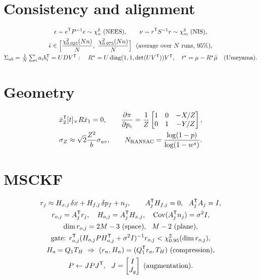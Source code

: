 \section*{Consistency and alignment}
\begin{gather*}
  \epsilon = e^{\mathsf{T}} P^{-1} e \sim \chi^2_n \ \text{(NEES)}, \qquad \nu = r^{\mathsf{T}} S^{-1} r \sim \chi^2_m \ \text{(NIS)}, \\
  \bar\epsilon \in \Big[\frac{\chi^2_{0.025}(Nn)}{N},\ \frac{\chi^2_{0.975}(Nn)}{N}\Big] \ \ \text{(average over } N\text{ runs, 95\%)}, \\
  \Sigma_{ab} = \tfrac1N\textstyle\sum_i a_ib_i^{\mathsf{T}} = UDV^{\mathsf{T}}:\quad R^\star = U\operatorname{diag}(1, 1, \det(UV^{\mathsf{T}}))V^{\mathsf{T}}, \quad t^\star = \mu - R^\star\hat\mu \quad \text{(Umeyama)} .
\end{gather*}

\section*{Geometry}
\begin{gather*}
  \bar x_2^{\mathsf{T}}[t]_{\times}R\bar x_1 = 0, \qquad \frac{\partial\pi}{\partial p_c} = \frac1Z\begin{bmatrix} 1 & 0 & -X/Z \\ 0 & 1 & -Y/Z\end{bmatrix}, \\
  \sigma_Z \approx \sqrt2\frac{Z^2}{b}\sigma_{uv}, \qquad N_{\mathrm{RANSAC}} = \frac{\log(1-p)}{\log(1 - w^s)} .
\end{gather*}

\section*{MSCKF}
\begin{gather*}
  r_j \approx H_{x,j}\,\delta x + H_{f,j}\,\delta p_f + n_j, \qquad A_j^{\mathsf{T}} H_{f,j} = 0,\ \ A_j^{\mathsf{T}} A_j = I, \\
  r_{o,j} = A_j^{\mathsf{T}} r_j,\quad H_{o,j} = A_j^{\mathsf{T}} H_{x,j},\quad \operatorname{Cov}(A_j^{\mathsf{T}} n_j) = \sigma^2 I, \\
  \dim r_{o,j} = 2M - 3 \ \text{(space)},\ \ M - 2 \ \text{(plane)}, \\
  \text{gate: } r_{o,j}^{\mathsf{T}}(H_{o,j}PH_{o,j}^{\mathsf{T}} + \sigma^2I)^{-1} r_{o,j} < \chi^2_{0.95}(\dim r_{o,j}), \\
  H_o = Q_1T_H \ \Rightarrow\ (r_n, H_n) = (Q_1^{\mathsf{T}} r_o, T_H) \ \text{(compression)}, \\
  P \gets JPJ^{\mathsf{T}},\ \ J = \begin{bmatrix} I \\ J_g\end{bmatrix} \ \text{(augmentation)} .
\end{gather*}

